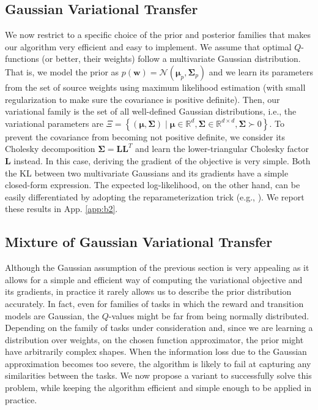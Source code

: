 \documentclass{article}
\begin{document}
\subsection{Gaussian Variational Transfer}\label{sec:gvt}

We now restrict to a specific choice of the prior and posterior families that makes our algorithm very efficient and easy to implement. We assume that optimal $Q$-functions (or better, their weights) follow a multivariate Gaussian distribution. That is, we model the prior as $p(\bm{w}) = \mathcal{N}(\bm{\mu}_p,\bm{\Sigma}_p)$ and we learn its parameters from the set of source weights using maximum likelihood estimation (with small regularization to make sure the covariance is positive definite). Then, our variational family is the set of all well-defined Gaussian distributions, i.e., the variational parameters are $\Xi = \left\{ (\bm{\mu},\bm{\Sigma}) \mid \bm{\mu}\in\mathbb{R}^d, \bm{\Sigma}\in\mathbb{R}^{d\times d}, \bm{\Sigma}\succ 0 \right\}$. To prevent the covariance from becoming not positive definite, we consider its Cholesky decomposition $\bm{\Sigma} = \bm{LL}^T$ and learn the lower-triangular Cholesky factor $\bm{L}$ instead. In this case, deriving the gradient of the objective is very simple. Both the KL between two multivariate Gaussians and its gradients have a simple closed-form expression. The expected log-likelihood, on the other hand, can be easily differentiated by adopting the reparameterization trick (e.g., \cite{hoffman2013stochastic,rezende2014stochastic}). We report these results in App. \ref{app:b2}.

\subsection{Mixture of Gaussian Variational Transfer}\label{sec:mgvt}

Although the Gaussian assumption of the previous section is very appealing as it allows for a simple and efficient way of computing the variational objective and its gradients, in practice it rarely allows us to describe the prior distribution accurately. In fact, even for families of tasks in which the reward and transition models are Gaussian, the $Q$-values might be far from being normally distributed. Depending on the family of tasks under consideration and, since we are learning a distribution over weights, on the chosen function approximator, the prior might have arbitrarily complex shapes. When the information loss due to the Gaussian approximation becomes too severe, the algorithm is likely to fail at capturing any similarities between the tasks. We now propose a variant to successfully solve this problem, while keeping the algorithm efficient and simple enough to be applied in practice.
\end{document}
